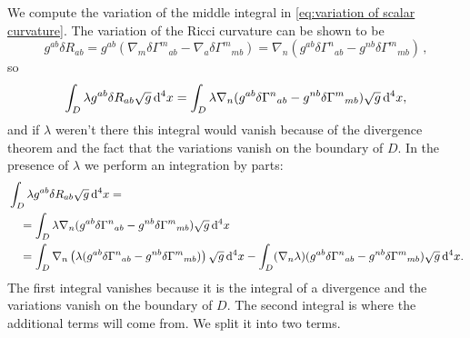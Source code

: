 \documentclass[../main.tex]{subfiles}
\begin{document}
We compute the variation of the middle integral in \cref{eq:variation of scalar curvature}.  The variation of the Ricci curvature can be shown to be
\begin{equation}\label{eq:variation ricci curvature}
	g^{ab} \delta R_{ab} = g^{ab}(\nabla_m \delta{\Gamma^m}_{ab} - \nabla_a \delta
	{\Gamma^m}_{mb}) = \nabla_n(g^{ab} {\delta\Gamma^n}_{ab} - g^{nb} \delta
	{\Gamma^m}_{mb})\,,
\end{equation}
so
\begin{equation*}
	\int_D \lambda g^{ab}\delta R_{ab} \sqrt{g} \,\mathrm{d}^4 x = \int_D \lambda \nabla_n(g^{ab}
	{\delta\Gamma^n}_{ab} - g^{nb} \delta {\Gamma^m}_{mb}) \sqrt{g} \,\mathrm{d}^4x,
\end{equation*}
and if \( \lambda \) weren't there this integral would vanish because of the divergence
theorem and the fact that the variations vanish on the boundary of \( D \). In the
presence of \( \lambda \) we perform an integration by parts:
\begin{align*}
	& \int_D \lambda g^{ab}\delta R_{ab} \sqrt{g} \,\mathrm{d}^4 x = \\
	& \quad = \int_D \lambda \nabla_n(g^{ab} {\delta\Gamma^n}_{ab} - g^{nb} \delta
	{\Gamma^m}_{mb}) \sqrt{g} \,\mathrm{d}^4x \\
	& \quad = \int_D \nabla_n \left(\lambda (g^{ab} {\delta\Gamma^n}_{ab} - g^{nb}
	\delta {\Gamma^m}_{mb})\right) \sqrt{g}\,\mathrm{d}^4 x - \int_D (\nabla_n \lambda) (g^{ab}
	{\delta\Gamma^n}_{ab} - g^{nb} \delta {\Gamma^m}_{mb}) \sqrt{g} \,\mathrm{d}^4 x. 
\end{align*}
The first integral vanishes because it is the integral of a divergence and the variations
vanish on the boundary of \( D \). The second integral is where the additional terms will
come from. We split it into two terms. 
\end{document}
